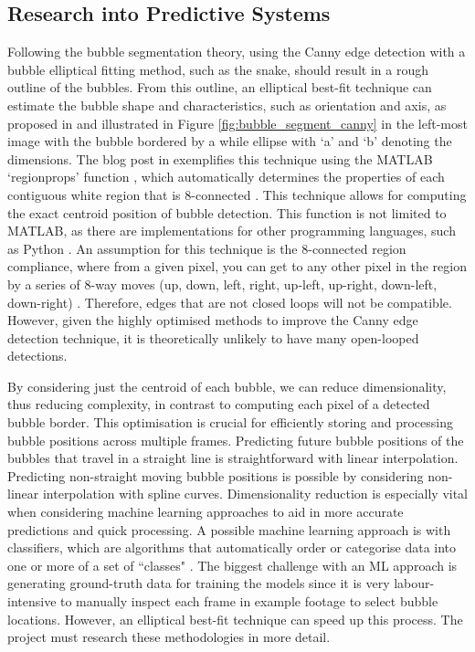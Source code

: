 \subsection{Research into Predictive Systems}
\label{bi_ps}
Following the bubble segmentation theory, using the Canny edge detection with a bubble elliptical fitting method, such as the snake, should result in a rough outline of the bubbles. From this outline, an elliptical best-fit technique can estimate the bubble shape and characteristics, such as orientation and axis, as proposed in \cite{thomanekAutomatedGasBubble2010} and illustrated in Figure \ref{fig:bubble_segment_canny} in the left-most image with the bubble bordered by a while ellipse with `a' and `b' denoting the dimensions. The blog post in \cite{steveeddinsEllipseVisualizationRegionprops2015} exemplifies this technique using the MATLAB `regionprops' function \cite{MeasurePropertiesImage}, which automatically determines the properties of each contiguous white region that is 8-connected \cite{rayryengAnswerExplanationMatlab2014}. This technique allows for computing the exact centroid position of bubble detection. This function is not limited to MATLAB, as there are implementations for other programming languages, such as Python \cite{MeasureRegionProperties}. An assumption for this technique is the 8-connected region compliance, where from a given pixel, you can get to any other pixel in the region by a series of 8-way moves (up, down, left, right, up-left, up-right, down-left, down-right) \cite{CourseNoteComputer}. Therefore, edges that are not closed loops will not be compatible. However, given the highly optimised methods to improve the Canny edge detection technique, it is theoretically unlikely to have many open-looped detections.

By considering just the centroid of each bubble, we can reduce dimensionality, thus reducing complexity, in contrast to computing each pixel of a detected bubble border. This optimisation is crucial for efficiently storing and processing bubble positions across multiple frames. Predicting future bubble positions of the bubbles that travel in a straight line is straightforward with linear interpolation. Predicting non-straight moving bubble positions is possible by considering non-linear interpolation with spline curves. Dimensionality reduction is especially vital when considering machine learning approaches to aid in more accurate predictions and quick processing. A possible machine learning approach is with classifiers, which are algorithms that automatically order or categorise data into one or more of a set of ``classes" \cite{tobiasgeislermesevageMachineLearningClassifiers2020}. The biggest challenge with an ML approach is generating ground-truth data for training the models since it is very labour-intensive to manually inspect each frame in example footage to select bubble locations. However, an elliptical best-fit technique can speed up this process. The project must research these methodologies in more detail.

